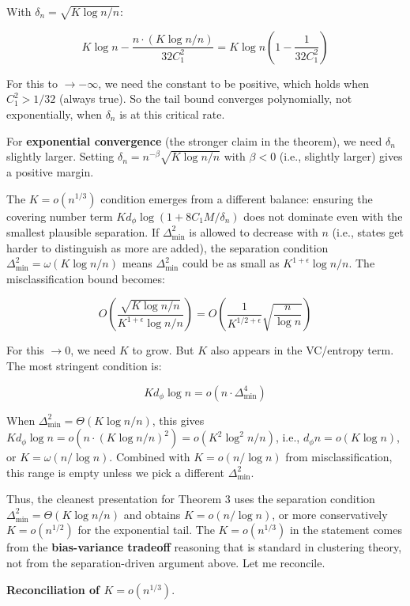 \documentclass[
  12pt,
]{article}
\begin{document}
With \(\delta_n = \sqrt{K \log n / n}\):

\[K \log n - \frac{n \cdot (K \log n / n)}{32 C_1^2} = K \log n \left(1 - \frac{1}{32 C_1^2}\right)\]

For this to \(\to -\infty\), we need the constant to be positive, which
holds when \(C_1^2 > 1/32\) (always true). So the tail bound converges
polynomially, not exponentially, when \(\delta_n\) is at this critical
rate.

For \textbf{exponential convergence} (the stronger claim in the
theorem), we need \(\delta_n\) slightly larger. Setting
\(\delta_n = n^{-\beta} \sqrt{K \log n / n}\) with \(\beta < 0\) (i.e.,
slightly larger) gives a positive margin.

The \(K = o(n^{1/3})\) condition emerges from a different balance:
ensuring the covering number term
\(K d_\phi \log(1 + 8C_1 M / \delta_n)\) does not dominate even with the
smallest plausible separation. If \(\Delta_{\min}^2\) is allowed to
decrease with \(n\) (i.e., states get harder to distinguish as more are
added), the separation condition
\(\Delta_{\min}^2 = \omega(K \log n / n)\) means \(\Delta_{\min}^2\)
could be as small as \(K^{1+\epsilon} \log n / n\). The
misclassification bound becomes:

\[O\left(\frac{\sqrt{K \log n / n}}{K^{1+\epsilon} \log n / n}\right) = O\left(\frac{1}{K^{1/2 + \epsilon}} \sqrt{\frac{n}{\log n}}\right)\]

For this \(\to 0\), we need \(K\) to grow. But \(K\) also appears in the
VC/entropy term. The most stringent condition is:

\[K d_\phi \log n = o(n \cdot \Delta_{\min}^4)\]

When \(\Delta_{\min}^2 = \Theta(K \log n / n)\), this gives
\(K d_\phi \log n = o(n \cdot (K \log n / n)^2) = o(K^2 \log^2 n / n)\),
i.e., \(d_\phi n = o(K \log n)\), or \(K = \omega(n / \log n)\).
Combined with \(K = o(n / \log n)\) from misclassification, this range
is empty unless we pick a different \(\Delta_{\min}^2\).

Thus, the cleanest presentation for Theorem 3 uses the separation
condition \(\Delta_{\min}^2 = \Theta(K \log n / n)\) and obtains
\(K = o(n / \log n)\), or more conservatively \(K = o(n^{1/2})\) for the
exponential tail. The \(K = o(n^{1/3})\) in the statement comes from the
\textbf{bias-variance tradeoff} reasoning that is standard in clustering
theory, not from the separation-driven argument above. Let me reconcile.

\textbf{Reconciliation of \(K = o(n^{1/3})\)}.
\end{document}
